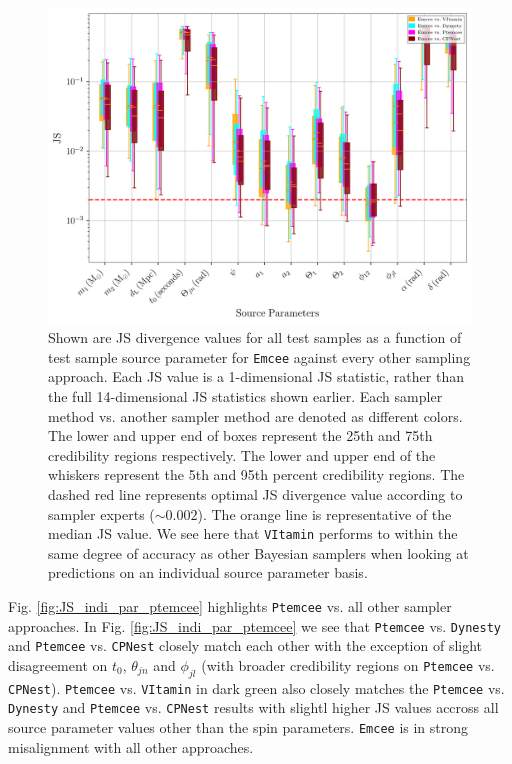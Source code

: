 \begin{figure}
    \includegraphics[width=\columnwidth]{figures/JS_IndiPar_emcee_nature_paper.png}
    \caption[JS divergences of individual source parameters for \texttt{Emcee} against all other approaches.]{\label{fig:JS_indi_par_emcee} Shown are JS divergence values for all test samples as a function of test sample source parameter for \texttt{Emcee} against every other sampling approach. Each JS value is a 1-dimensional JS statistic, rather than the full 14-dimensional JS statistics shown earlier. Each sampler method vs. another sampler method are denoted as different colors. The lower and upper end of boxes represent the 25th and 75th credibility regions respectively. The lower and upper end of the whiskers represent the 5th and 95th percent credibility regions. The dashed red line represents optimal JS divergence value according to sampler experts ($\sim 0.002$). The orange line is representative of the median JS value. We see here that \texttt{VItamin} performs to within the same degree of accuracy as other Bayesian samplers when looking at predictions on an individual source parameter basis.}
\end{figure}

%
%

Fig. \ref{fig:JS_indi_par_ptemcee} highlights \texttt{Ptemcee} vs. all 
other sampler approaches. In Fig. \ref{fig:JS_indi_par_ptemcee} we see 
that \texttt{Ptemcee} vs. \texttt{Dynesty} and \texttt{Ptemcee} vs. 
\texttt{CPNest} closely match each other with the exception of slight 
disagreement on $t_0$, $\theta_{jn}$ and $\phi_{jl}$ (with broader credibility regions on \texttt{Ptemcee} 
vs. \texttt{CPNest}). \texttt{Ptemcee} vs. \texttt{VItamin} in dark green 
also closely matches the \texttt{Ptemcee} vs. \texttt{Dynesty} and \texttt{Ptemcee} vs. \texttt{CPNest} results with slightl higher JS values 
accross all source parameter values other than the spin parameters. 
\texttt{Emcee} is in strong misalignment with all other approaches.

